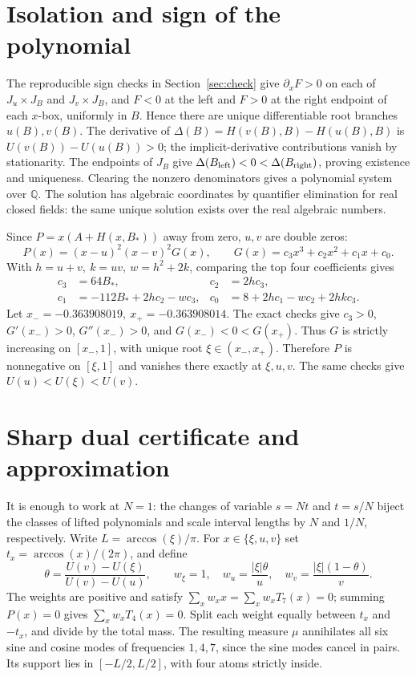 \documentclass[11pt]{article}
\begin{document}
\section{Isolation and sign of the polynomial}
The reproducible sign checks in Section~\ref{sec:check} give
\(\partial_x F>0\) on each of \(J_u\times J_B\) and \(J_v\times J_B\),
and \(F<0\) at the left and \(F>0\) at the right endpoint of each
\(x\)-box, uniformly in \(B\). Hence there are unique differentiable
root branches \(u(B),v(B)\). The derivative of
\(\Delta(B)=H(v(B),B)-H(u(B),B)\) is \(U(v(B))-U(u(B))>0\);
the implicit-derivative contributions vanish by stationarity.
The endpoints of \(J_B\) give \(\Delta(B_{\rm left})<0<
\Delta(B_{\rm right})\), proving existence and uniqueness. Clearing the
nonzero denominators gives a polynomial system over \(\mathbb Q\).
The solution has algebraic coordinates by quantifier elimination for
real closed fields: the same unique solution exists over the real
algebraic numbers.

Since \(P=x(A+H(x,B_*))\) away from zero, \(u,v\) are double zeros:
\[
 P(x)=(x-u)^2(x-v)^2G(x),\qquad
 G(x)=c_3x^3+c_2x^2+c_1x+c_0 .
\]
With \(h=u+v,\ k=uv,\ w=h^2+2k\), comparing the top four coefficients gives
\begin{align*}
 c_3&=64B_*, & c_2&=2hc_3,\\
 c_1&=-112B_*+2hc_2-wc_3, &
 c_0&=8+2hc_1-wc_2+2hkc_3.
\end{align*}
Let \(x_-=-0.363908019,\ x_+=-0.363908014\). The exact checks give
\(c_3>0\), \(G'(x_-)>0\), \(G''(x_-)>0\), and \(G(x_-)<0<G(x_+)\).
Thus \(G\) is strictly increasing on \([x_-,1]\), with unique root
\(\xi\in(x_-,x_+)\). Therefore \(P\) is nonnegative on \([\xi,1]\)
and vanishes there exactly at \(\xi,u,v\).
The same checks give \(U(u)<U(\xi)<U(v)\).

\section{Sharp dual certificate and approximation}
It is enough to work at \(N=1\): the changes of variable \(s=Nt\) and
\(t=s/N\) biject the classes of lifted polynomials and scale interval
lengths by \(N\) and \(1/N\), respectively. Write \(L=\arccos(\xi)/\pi\).
For \(x\in\{\xi,u,v\}\) set \(t_x=\arccos(x)/(2\pi)\), and define
\[
 \theta=\frac{U(v)-U(\xi)}{U(v)-U(u)},\qquad
 w_\xi=1,\quad w_u=\frac{|\xi|\theta}{u},\quad
 w_v=\frac{|\xi|(1-\theta)}{v}.
\]
The weights are positive and satisfy
\(\sum_x w_xx=\sum_xw_xT_7(x)=0\); summing \(P(x)=0\) gives
\(\sum_xw_xT_4(x)=0\). Split each weight equally between \(t_x\) and
\(-t_x\), and divide by the total mass. The resulting measure \(\mu\)
annihilates all six sine and cosine modes of frequencies \(1,4,7\),
since the sine modes cancel in pairs. Its support lies in
\([-L/2,L/2]\), with four atoms strictly inside.
\end{document}
